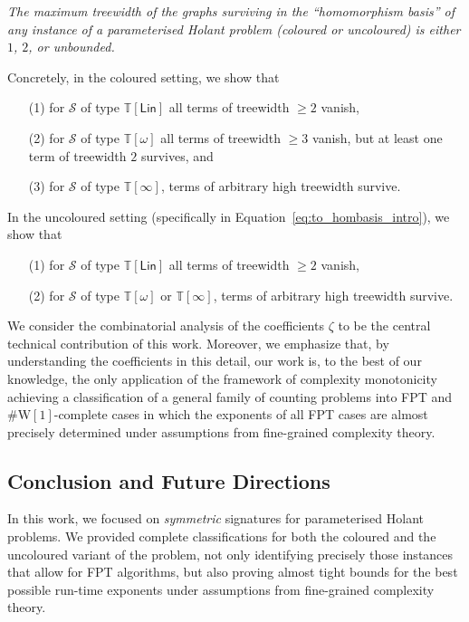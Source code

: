 \documentclass[authorcolumns,numberwithinsect]{no-lipics-v2022}
\begin{document}
\begin{center}
    \textit{The maximum treewidth of the graphs surviving in the ``homomorphism basis'' of \emph{any} instance of a parameterised Holant problem (coloured or uncoloured) is either $1$, $2$, or unbounded.}
\end{center}
Concretely, in the coloured setting, we show that 
\begin{enumerate}
    \item[(1)] for $\mathcal{S}$ of type $\mathbb{T}[\mathsf{Lin}]$ all terms of treewidth $\geq 2$ vanish,
    \item[(2)] for $\mathcal{S}$ of type $\mathbb{T}[\omega]$ all terms of treewidth $\geq 3$ vanish, but at least one term of treewidth $2$ survives, and
    \item[(3)] for $\mathcal{S}$ of type $\mathbb{T}[\infty]$, terms of arbitrary high treewidth survive.
\end{enumerate}
In the uncoloured setting (specifically in Equation~\eqref{eq:to_hombasis_intro}), we show that 
\begin{enumerate}
    \item[(1)] for $\mathcal{S}$ of type $\mathbb{T}[\mathsf{Lin}]$ all terms of treewidth $\geq 2$ vanish,
    \item[(2)] for $\mathcal{S}$ of type $\mathbb{T}[\omega]$ or $\mathbb{T}[\infty]$, terms of arbitrary high treewidth survive.
\end{enumerate}

We consider the combinatorial analysis of the coefficients $\zeta$ to be the central technical contribution of this work. Moreover, we emphasize that, by understanding the coefficients in this detail, our work is, to the best of our knowledge, the only application of the framework of complexity monotonicity achieving a classification of a general family of counting problems into FPT and $\#\mathrm{W}[1]$-complete cases in which the exponents of all FPT cases are almost precisely determined under assumptions from fine-grained complexity theory. 


\subsection{Conclusion and Future Directions}
In this work, we focused on \emph{symmetric} signatures for parameterised Holant problems. We provided complete classifications for both the coloured and the uncoloured variant of the problem, not only identifying precisely those instances that allow for FPT algorithms, but also proving almost tight bounds for the best possible run-time exponents under assumptions from fine-grained complexity theory.
\end{document}

